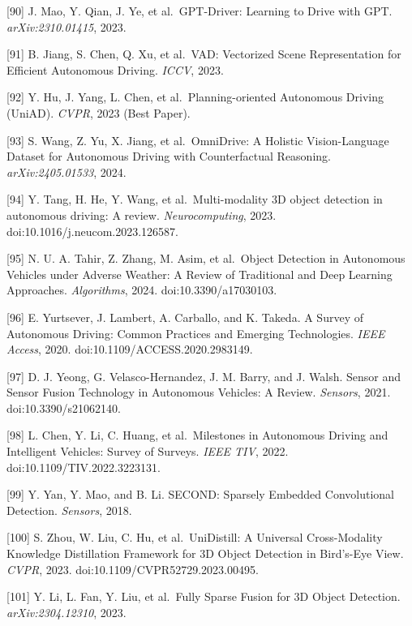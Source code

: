 {[}90{]} J. Mao, Y. Qian, J. Ye, et al.~GPT-Driver: Learning to Drive with GPT. \emph{arXiv:2310.01415}, 2023.

{[}91{]} B. Jiang, S. Chen, Q. Xu, et al.~VAD: Vectorized Scene Representation for Efficient Autonomous Driving. \emph{ICCV}, 2023.

{[}92{]} Y. Hu, J. Yang, L. Chen, et al.~Planning-oriented Autonomous Driving (UniAD). \emph{CVPR}, 2023 (Best Paper).

{[}93{]} S. Wang, Z. Yu, X. Jiang, et al.~OmniDrive: A Holistic Vision-Language Dataset for Autonomous Driving with Counterfactual Reasoning. \emph{arXiv:2405.01533}, 2024.

{[}94{]} Y. Tang, H. He, Y. Wang, et al.~Multi-modality 3D object detection in autonomous driving: A review. \emph{Neurocomputing}, 2023. doi:10.1016/j.neucom.2023.126587.

{[}95{]} N. U. A. Tahir, Z. Zhang, M. Asim, et al.~Object Detection in Autonomous Vehicles under Adverse Weather: A Review of Traditional and Deep Learning Approaches. \emph{Algorithms}, 2024. doi:10.3390/a17030103.

{[}96{]} E. Yurtsever, J. Lambert, A. Carballo, and K. Takeda. A Survey of Autonomous Driving: Common Practices and Emerging Technologies. \emph{IEEE Access}, 2020. doi:10.1109/ACCESS.2020.2983149.

{[}97{]} D. J. Yeong, G. Velasco-Hernandez, J. M. Barry, and J. Walsh. Sensor and Sensor Fusion Technology in Autonomous Vehicles: A Review. \emph{Sensors}, 2021. doi:10.3390/s21062140.

{[}98{]} L. Chen, Y. Li, C. Huang, et al.~Milestones in Autonomous Driving and Intelligent Vehicles: Survey of Surveys. \emph{IEEE TIV}, 2022. doi:10.1109/TIV.2022.3223131.

{[}99{]} Y. Yan, Y. Mao, and B. Li. SECOND: Sparsely Embedded Convolutional Detection. \emph{Sensors}, 2018.

{[}100{]} S. Zhou, W. Liu, C. Hu, et al.~UniDistill: A Universal Cross-Modality Knowledge Distillation Framework for 3D Object Detection in Bird's-Eye View. \emph{CVPR}, 2023. doi:10.1109/CVPR52729.2023.00495.

{[}101{]} Y. Li, L. Fan, Y. Liu, et al.~Fully Sparse Fusion for 3D Object Detection. \emph{arXiv:2304.12310}, 2023.

